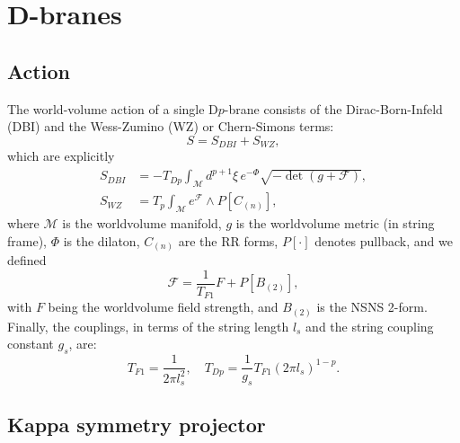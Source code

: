 \section{D-branes}

\subsection{Action}
The world-volume action of a single D$p$-brane consists of the Dirac-Born-Infeld (DBI) and the Wess-Zumino (WZ) or Chern-Simons terms:
\begin{equation}
 S = S_{DBI} + S_{WZ},
\end{equation}
which are explicitly
\begin{align}
 S_{DBI} & = 
 -T_{Dp} \int_\mathcal{M} d^{p+1}\xi  \, e^{-\Phi }  \sqrt{-\det (g+\mathcal{F})},\\
 S_{WZ} & =
 T_p\int _\mathcal{M} e^{\mathcal{F}}\wedge P[C_{(n)}],
\end{align}
where $\mathcal{M}$ is the worldvolume manifold, $g$ is the worldvolume metric (in string frame), $\Phi$ is the dilaton, $C_{(n)}$ are the RR forms, $P[\cdot]$ denotes pullback, and we defined
\begin{equation}
 \mathcal{F} = \dfrac{1}{T_{F1}} F + P[B_{(2)}], 
\end{equation}
with $F$ being the worldvolume field strength, and $B_{(2)}$ is the NSNS 2-form. Finally, the couplings, in terms of the string length $l_s$ and the string coupling constant $g_s$, are:
\begin{equation}
 T_{F1} = \dfrac{1}{2\pi l_s^2}, \quad T_{Dp} = \dfrac{1}{g_s} T_{F1} (2\pi l_s)^{1-p}.
\end{equation}


\subsection{Kappa symmetry projector}

